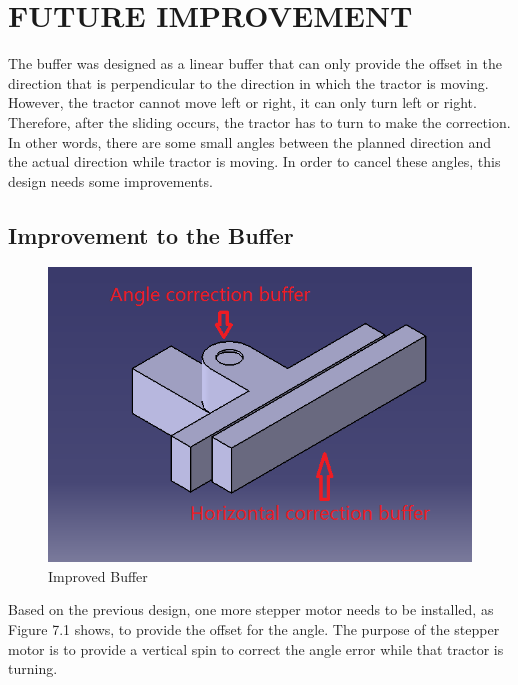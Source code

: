 \documentclass[letterpaper,12pt,oneside]{book}
\begin{document}
		\chapter{FUTURE IMPROVEMENT}
			
		The buffer was designed as a linear buffer that can only provide the offset in the direction that is perpendicular to the direction in which the tractor is moving. However, the tractor cannot move left or right, it can only turn left or right. Therefore, after the sliding occurs, the tractor has to turn to make the correction. In other words, there are some small angles between the planned direction and the actual direction while tractor is moving. In order to cancel these angles, this design needs some improvements.
		
		\section{Improvement to the Buffer}
		\begin{figure}[ht!]
			\begin{center}
				\includegraphics[scale = 0.8]{improvedbuffer.png}
				\caption{Improved Buffer}
			\end{center}
		\end{figure}
		Based on the previous design, one more stepper motor needs to be installed, as Figure 7.1 shows, to provide the offset for the angle. The purpose of the stepper motor is to provide a vertical spin to correct the angle error while that tractor is turning. 
		
\end{document}
